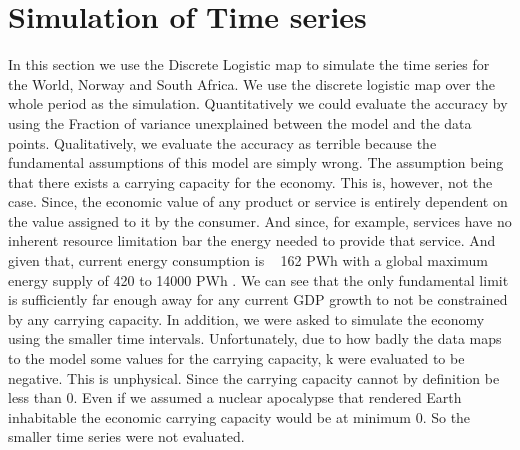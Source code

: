 \documentclass[11pt,a4paper]{CLabBookTemplate} %
\begin{document}
\section{Simulation of Time series}
In this section we use the Discrete Logistic map to simulate the time series for the World, Norway and South Africa. We use the discrete logistic map over the whole period as the simulation. Quantitatively we could evaluate the accuracy by using the Fraction of variance unexplained between the model and the data points. Qualitatively, we evaluate the accuracy as terrible because the fundamental assumptions of this model are simply wrong. The assumption being that there exists a carrying capacity for the economy. This is, however, not the case. Since, the economic value of any product or service is entirely dependent on the value assigned to it by the consumer. And since, for example, services have no inherent resource limitation bar the energy needed to provide that service. And given that, current energy consumption is ~ 162 PWh \autocite{IEA} with a global maximum energy supply of 420 to 14000 PWh \autocite{UN}. We can see that the only fundamental limit is sufficiently far enough away for any current GDP growth to not be constrained by any carrying capacity. \newline
In addition, we were asked to simulate the economy using the smaller time intervals. Unfortunately, due to how badly the data maps to the model some values for the carrying capacity, k were evaluated to be negative. This is unphysical. Since the carrying capacity cannot by definition be less than 0. Even if we assumed a nuclear apocalypse that rendered Earth inhabitable the economic carrying capacity would be at minimum 0. So the smaller time series were not evaluated. 
\end{document}
